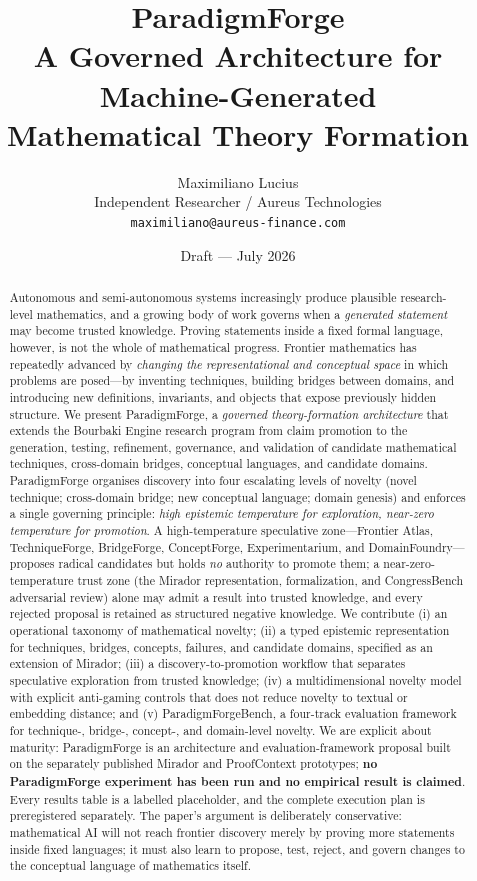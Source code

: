 \documentclass[11pt]{article}
\title{\textbf{ParadigmForge}\\[2pt]
\large A Governed Architecture for Machine-Generated\\ Mathematical Theory Formation}
\author{Maximiliano Lucius\\
\small Independent Researcher / Aureus Technologies\\
\small \texttt{maximiliano@aureus-finance.com}}
\date{Draft --- July 2026}
\theoremstyle{definition}
\theoremstyle{remark}
\newcommand{\pfbench}{ParadigmForgeBench}
\newcommand{\PF}{ParadigmForge}
\begin{document}
\maketitle

\begin{abstract}
\noindent
Autonomous and semi-autonomous systems increasingly produce plausible research-level
mathematics, and a growing body of work governs when a \emph{generated statement} may become
trusted knowledge. Proving statements inside a fixed formal language, however, is not the whole of
mathematical progress. Frontier mathematics has repeatedly advanced by \emph{changing the
representational and conceptual space} in which problems are posed---by inventing techniques,
building bridges between domains, and introducing new definitions, invariants, and objects that
expose previously hidden structure. We present \PF{}, a \emph{governed theory-formation
architecture} that extends the Bourbaki Engine research program from claim promotion to the
generation, testing, refinement, governance, and validation of candidate mathematical techniques,
cross-domain bridges, conceptual languages, and candidate domains. \PF{} organises discovery into
four escalating levels of novelty (novel technique; cross-domain bridge; new conceptual language;
domain genesis) and enforces a single governing principle: \emph{high epistemic temperature for
exploration, near-zero temperature for promotion}. A high-temperature speculative zone---Frontier
Atlas, TechniqueForge, BridgeForge, ConceptForge, Experimentarium, and DomainFoundry---proposes
radical candidates but holds \emph{no} authority to promote them; a near-zero-temperature trust
zone (the Mirador representation, formalization, and CongressBench adversarial review) alone may
admit a result into trusted knowledge, and every rejected proposal is retained as structured
negative knowledge. We contribute (i) an operational taxonomy of mathematical novelty; (ii) a
typed epistemic representation for techniques, bridges, concepts, failures, and candidate domains,
specified as an extension of Mirador; (iii) a discovery-to-promotion workflow that separates
speculative exploration from trusted knowledge; (iv) a multidimensional novelty model with explicit
anti-gaming controls that does not reduce novelty to textual or embedding distance; and (v)
\pfbench{}, a four-track evaluation framework for technique-, bridge-, concept-, and domain-level
novelty. We are explicit about maturity: \PF{} is an architecture and evaluation-framework
proposal built on the separately published Mirador and ProofContext prototypes; \textbf{no \PF{}
experiment has been run and no empirical result is claimed}. Every results table is a labelled
placeholder, and the complete execution plan is preregistered separately. The paper's argument is
deliberately conservative: mathematical AI will not reach frontier discovery merely by proving more
statements inside fixed languages; it must also learn to propose, test, reject, and govern changes
to the conceptual language of mathematics itself.
\end{abstract}
\end{document}
